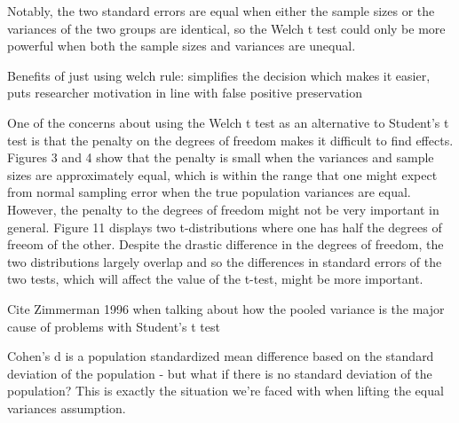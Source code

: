 \documentclass[man,a4paper,noextraspace,apacite]{apa6}\usepackage[]{graphicx}\usepackage[]{color}
\begin{document}
    Notably, the two standard errors are equal when either the sample sizes or the variances of the two groups are identical, so the Welch t test could only be more powerful when both the sample sizes and variances are unequal. 
    
    Benefits of just using welch rule: simplifies the decision which makes it easier, puts researcher motivation in line with false positive preservation

    One of the concerns about using the Welch t test as an alternative to Student's t test is that the penalty on the degrees of freedom makes it difficult to find effects. Figures 3 and 4 show that the penalty is small when the variances and sample sizes are approximately equal, which is within the range that one might expect from normal sampling error when the true population variances are equal. However, the penalty to the degrees of freedom might not be very important in general. Figure 11 displays two t-distributions where one has half the degrees of freeom of the other. Despite the drastic difference in the degrees of freedom, the two distributions largely overlap and so the differences in standard errors of the two tests, which will affect the value of the t-test, might be more important.
    
    Cite Zimmerman 1996 when talking about how the pooled variance is the major cause of problems with Student's t test
    
    Cohen's d is a population standardized mean difference based on the standard deviation of the population - but what if there is no standard deviation of the population? This is exactly the situation we're faced with when lifting the equal variances assumption.
  







\end{document}
